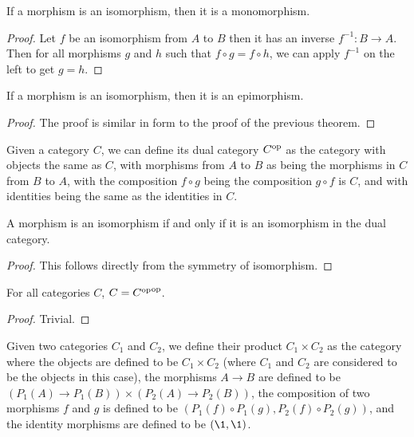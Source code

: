 \documentclass[../math.tex]{subfiles}
\begin{document}
\begin{theorem} \label{isomorphism_monomorphism}
    If a morphism is an isomorphism, then it is a monomorphism.
\end{theorem}
\begin{proof}
    Let $f$ be an isomorphism from $A$ to $B$ then it has an inverse $f^{-1} : B
    \to A$.  Then for all morphisms $g$ and $h$ such that $f \circ g = f \circ
    h$, we can apply $f^{-1}$ on the left to get $g = h$.
\end{proof}

\begin{theorem} \label{isomorphism_epimorphism}
    If a morphism is an isomorphism, then it is an epimorphism.
\end{theorem}
\begin{proof}
    The proof is similar in form to the proof of the previous theorem.
\end{proof}

\begin{definition}
    Given a category $C$, we can define its dual category $C^{\mathrm{op}}$ as the
    category with objects the same as $C$, with morphisms from $A$ to $B$ as
    being the morphisms in $C$ from $B$ to $A$, with the composition $f \circ g$
    being the composition $g \circ f$ is $C$, and with identities being the same
    as the identities in $C$.
\end{definition}

\begin{theorem}
    A morphism is an isomorphism if and only if it is an isomorphism in the dual
    category.
\end{theorem}
\begin{proof}
    This follows directly from the symmetry of isomorphism.
\end{proof}

\begin{theorem}
    For all categories $C$, $C = {C^{\mathrm{op}}}^{\mathrm{op}}$.
\end{theorem}
\begin{proof}
    Trivial.
\end{proof}

\begin{definition}
    Given two categories $C_1$ and $C_2$, we define their product $C_1 \times
    C_2$ as the category where the objects are defined to be $C_1 \times C_2$
    (where $C_1$ and $C_2$ are considered to be the objects in this case), the
    morphisms $A \to B$ are defined to be $(P_1(A) \to P_1(B)) \times (P_2(A)
    \to P_2(B))$, the composition of two morphisms $f$ and $g$ is defined to be
    $(P_1(f) \circ P_1(g), P_2(f) \circ P_2(g))$, and the identity morphisms are
    defined to be $(\1, \1)$.
\end{definition}
\end{document}
